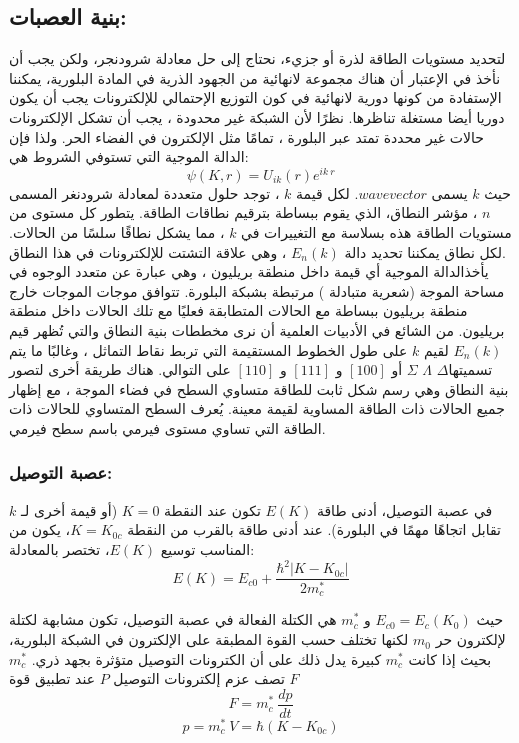 \subsection{بنية العصبات:}
لتحديد مستويات الطاقة لذرة أو جزيء، نحتاج إلى حل معادلة شرودنجر، ولكن يجب أن نأخذ في الإعتبار أن هناك مجموعة لانهائية من الجهود الذرية في المادة البلورية، يمكننا الإستفادة من كونها دورية لانهائية في كون التوزيع الإحتمالي للإلكترونات يجب أن يكون دوريا أيضا مستغلة تناظرها. نظرًا لأن الشبكة غير محدودة ، يجب أن تشكل الإلكترونات حالات غير محددة تمتد عبر البلورة ، تمامًا مثل الإلكترون في الفضاء الحر. ولذا فإن الدالة الموجية التي تستوفي الشروط هي:   
\begin{equation}
	\psi \left( K,r \right)= U_{ik}\left( r \right) e^{ik\ r} 
\end{equation}
حيث $ k $ يسمى $ wavevector $. لكل قيمة $ k $ ، توجد حلول متعددة لمعادلة شرودنغر المسمى $ n $ ، مؤشر النطاق، الذي يقوم ببساطة بترقيم نطاقات الطاقة. يتطور كل مستوى من مستويات الطاقة هذه بسلاسة مع التغييرات في $ k $ ، مما يشكل نطاقًا سلسًا من الحالات. لكل نطاق يمكننا تحديد دالة $ E_n(k) $ ، وهي علاقة التشتت للإلكترونات في هذا النطاق.
\\
يأخذالدالة الموجية أي قيمة داخل منطقة بريليون ، وهي عبارة عن متعدد الوجوه في مساحة الموجة (شعرية متبادلة ) مرتبطة بشبكة البلورة. تتوافق موجات الموجات خارج منطقة بريليون ببساطة مع الحالات المتطابقة فعليًا مع تلك الحالات داخل منطقة بريليون. من الشائع في الأدبيات العلمية أن نرى مخططات بنية النطاق والتي تُظهر قيم $ E_n(k) $ لقيم $ k $ على طول الخطوط المستقيمة التي تربط نقاط التماثل ، وغالبًا ما يتم تسميتها$  Δ $  $ Λ $  $ Σ $ أو $ [100] $ و $ [111] $ و $ [110] $ على التوالي. هناك طريقة أخرى لتصور بنية النطاق وهي رسم شكل ثابت للطاقة متساوي السطح في فضاء الموجة ، مع إظهار جميع الحالات ذات الطاقة المساوية لقيمة معينة. يُعرف السطح المتساوي للحالات ذات الطاقة التي تساوي مستوى فيرمي باسم سطح فيرمي.
\subsubsection{عصبة التوصيل:}
في عصبة التوصيل، أدنى طاقة $ E(K) $ تكون عند النقطة $ K=0 $ (أو  قيمة أخرى لـ $ k $ تقابل اتجاهًا مهمًا في البلورة). عند أدنى طاقة بالقرب من النقطة $ K=K_{0c} $، يكون من المناسب توسيع $ E(K) $، تختصر بالمعادلة:
\begin{equation}
	E\left( K\right) = E_{c0} + \dfrac{ 
		\hbar^{2}\left| K-K_{0c}\right| }{2m^{*}_c}
\end{equation}

حيث $ E_{c0}=E_c(K_0) $ و $ m^{*}_c $ هي الكتلة الفعالة في عصبة التوصيل، تكون مشابهة لكتلة لإلكترون حر $ m_0 $ لكنها تختلف حسب القوة المطبقة على الإلكترون في الشبكة البلورية، بحيث إذا كانت $ m^{*}_c $ كبيرة يدل ذلك على أن الكترونات التوصيل متؤثرة بجهد ذري. $ m^{*}_c $ تصف عزم إلكترونات التوصيل $ P $ عند تطبيق قوة $ F  $
\begin{equation}
	F= m^{*}_c\ \frac{dp}{dt}
\end{equation}
\begin{equation}
	p= m^{*}_c\ V= \hbar \left( K-K_{0c}\right) 
\end{equation}
